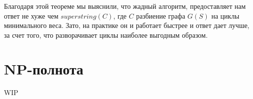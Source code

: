 \documentclass[a4paper,10pt]{article}
\begin{document}
Благодаря этой теореме мы выяснили, что жадный алгоритм, предоставляет нам ответ не хуже чем $superstring(C)$, 
где $C$ разбиение графа $G(S)$ на циклы минимального веса.
Зато, на практике он и работает быстрее и ответ дает лучше, за счет того, что разворачивает циклы наиболее выгодным образом.

\section{NP-полнота}

WIP
\end{document}
